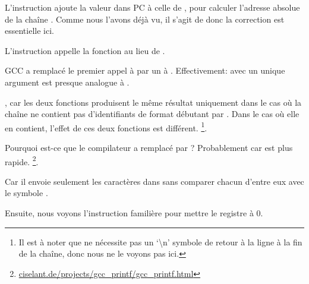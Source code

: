 L'instruction  ajoute la valeur dans \ac{PC} à celle de
, pour calculer l'adresse absolue de la chaîne .
Comme nous l'avons déjà vu, il s'agit de \q{\PICcode} donc la correction
est essentielle ici.

L'instruction  appelle la fonction \puts au lieu de \printf.

\label{puts}

GCC a remplacé le premier appel à \printf par un à \puts.
Effectivement: \printf avec un unique argument est presque analogue à \puts.

, car les deux fonctions produisent le même résultat uniquement dans
le cas où la chaîne ne contient pas d'identifiants de format débutant par \IT{\%}.
Dans le cas où elle en contient, l'effet de ces deux fonctions est différent.
\footnote{Il est à noter que \puts ne nécessite pas un `\textbackslash{}n'
symbole de retour à la ligne à la fin de la chaîne, donc nous ne le voyons pas ici.}.

Pourquoi est-ce que le compilateur a remplacé \printf par \puts? Probablement car
\puts est plus rapide.
\footnote{\href{http://go.yurichev.com/17063}{ciselant.de/projects/gcc\_printf/gcc\_printf.html}}. 

Car il envoie seulement les caractères dans 
sans comparer chacun d'entre eux avec le symbole \IT{\%}.

Ensuite, nous voyons l'instruction familière  pour mettre le
registre  à 0.
